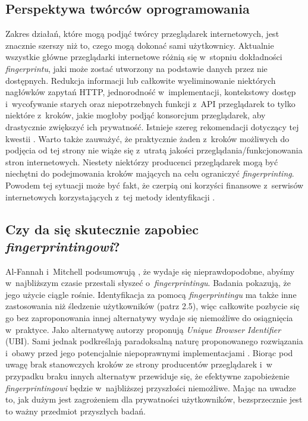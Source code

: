 \subsection{Perspektywa twórców oprogramowania}
Zakres działań, które mogą podjąć twórcy przeglądarek internetowych, jest
znacznie szerszy niż to, czego mogą dokonać sami użytkownicy. Aktualnie
wszystkie główne przeglądarki internetowe różnią się w~stopniu dokładności
\emph{fingerprintu}, jaki może zostać utworzony na podstawie danych przez nie
dostępnych. Redukcja informacji lub całkowite wyeliminowanie niektórych
nagłówków zapytań HTTP, jednorodność w~implementacji, kontekstowy dostęp
i~wycofywanie starych oraz niepotrzebnych funkcji z~API przeglądarek to tylko
niektóre z~kroków, jakie mogłoby podjąć konsorcjum przeglądarek, aby drastycznie
zwiększyć ich prywatność. Istnieje szereg rekomendacji dotyczący tej kwestii
\cite{cooper2013privacy,doty2014fingerprinting,eckersley2010unique,nikiforakis2014workings}.
Warto także zauważyć, że praktycznie żaden z~kroków możliwych do podjęcia od tej
strony nie wiąże się z~utratą jakości przeglądania/funkcjonowania stron
internetowych. Niestety niektórzy producenci przeglądarek mogą być niechętni do
podejmowania kroków mających na celu ograniczyć \emph{fingerprinting}. Powodem
tej sytuacji może być fakt, że czerpią oni korzyści finansowe z~serwisów
internetowych korzystających z~tej metody identyfikacji \cite[s. 13]{al2020too}.

\subsection{Czy da się skutecznie zapobiec \emph{fingerprintingowi}?}
Al-Fannah i~Mitchell podsumowują \cite[s. 18]{al2020too}, że wydaje się
nieprawdopodobne, abyśmy w~najbliższym czasie przestali słyszeć
o~\emph{fingerprintingu}. Badania pokazują, że jego użycie ciągle rośnie.
Identyfikacja za pomocą \emph{fingerprintingu} ma także inne zastosowania niż
śledzenie użytkowników (patrz 2.5), więc całkowite pozbycie się go bez
zaproponowania innej alternatywy wydaje się niemożliwe do osiągnięcia
w~praktyce. Jako alternatywę autorzy proponują \emph{Unique Browser Identifier}
(UBI). Sami jednak podkreślają paradoksalną naturę proponowanego rozwiązania
i~obawy przed jego potencjalnie niepoprawnymi implementacjami \cite[s.
16]{al2020too}. Biorąc pod uwagę brak stanowczych kroków ze strony producentów
przeglądarek i~w przypadku braku innych alternatyw przewiduje się, że efektywne
zapobieżenie \emph{fingerprintingowi} będzie w~najbliższej przyszłości
niemożliwe. Mając na uwadze to, jak dużym jest zagrożeniem dla prywatności
użytkowników, bezsprzecznie jest to ważny przedmiot przyszłych badań.

